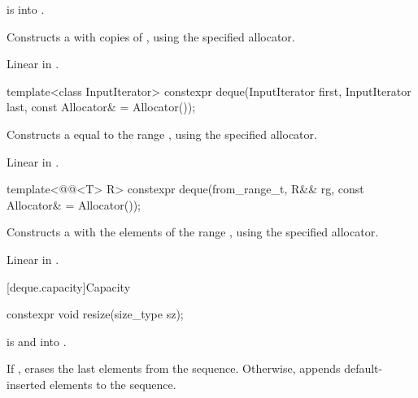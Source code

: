 \begin{itemdescr}
\pnum
\expects
{} is  into .

\pnum
\effects
Constructs a
with  copies of ,
using the specified allocator.

\pnum
\complexity
Linear in .
\end{itemdescr}

%
\begin{itemdecl}
template<class InputIterator>
  constexpr deque(InputIterator first, InputIterator last, const Allocator& = Allocator());
\end{itemdecl}

\begin{itemdescr}
\pnum
\effects
Constructs a
equal to the range
,
using the specified allocator.

\pnum
\complexity
Linear in .
\end{itemdescr}

%
\begin{itemdecl}
template<@@<T> R>
  constexpr deque(from_range_t, R&& rg, const Allocator& = Allocator());
\end{itemdecl}

\begin{itemdescr}
\pnum
\effects
Constructs a  with the elements of the range ,
using the specified allocator.

\pnum
\complexity
Linear in .
\end{itemdescr}

[deque.capacity]{Capacity}

%
\begin{itemdecl}
constexpr void resize(size_type sz);
\end{itemdecl}

\begin{itemdescr}
\pnum
\expects
{} is  and  into .

\pnum
\effects
If , erases the last  elements
from the sequence. Otherwise,
appends  default-inserted elements to the sequence.
\end{itemdescr}

